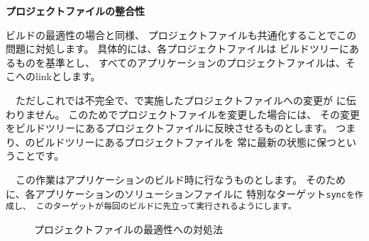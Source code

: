 \medskip
\noindent
\bf{プロジェクトファイルの整合性}
\begin{narrow}[20pt]
	ビルドの最適性の場合と同様、
	プロジェクトファイルも共通化することでこの問題に対処します。
	具体的には、各プロジェクトファイルは
	\SprLib ビルドツリーにあるものを基準とし、
	すべてのアプリケーションのプロジェクトファイルは、そこへのlinkとします。

	　ただしこれでは不完全で、で実施したプロジェクトファイルへの変更が
	に伝わりません。
	このためでプロジェクトファイルを変更した場合には、
	その変更を\SprLib ビルドツリーにあるプロジェクトファイルに反映させるものとします。
	つまり、\SprLib のビルドツリーにあるプロジェクトファイルを
	常に最新の状態に保つということです。

	　この作業はアプリケーションのビルド時に行なうものとします。
	そのために、各アプリケーションのソリューションファイルに
	特別なターゲット\tt{sync}を作成し、
	このターゲットが毎回のビルドに先立って実行されるようにします。

	\begin{figure}[h]
    	\begin{narrow}[40pt]\begin{minipage}{\textwidth}
		{\footnotesize{}}
		\medskip
    	\end{minipage}\end{narrow}
    	\begin{narrow}[40pt]\begin{minipage}{\textwidth}
		{\footnotesize{}}
		\medskip
  	\end{minipage}\end{narrow}
	\caption{プロジェクトファイルの最適性への対処法}
	\label{fig:SolutionToProjectFile}
	\end{figure}
\end{narrow}

